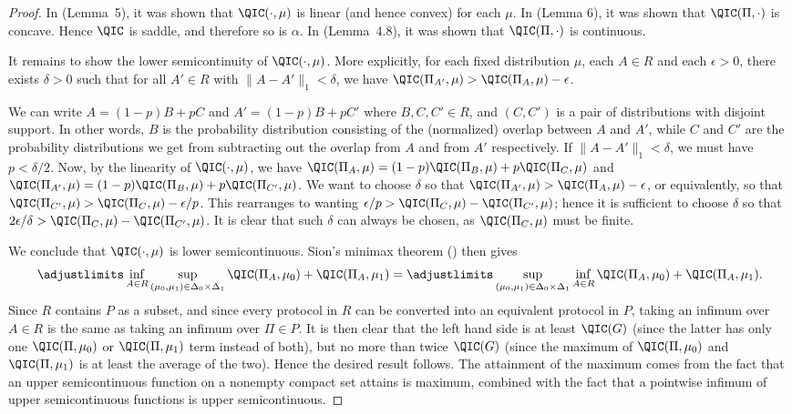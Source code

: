 \begin{proof}
In \cite{Tou15} (Lemma~5), it was shown that $\QIC(\cdot,\mu)$
is linear (and hence convex) for each $\mu$. In \cite{Tou15}
(Lemma 6), it was shown that $\QIC(\Pi,\cdot)$ is concave.
Hence $\QIC$ is saddle, and therefore so is $\alpha$.
In \cite{BGK+18} (Lemma~4.8), it was shown that $\QIC(\Pi,\cdot)$
is continuous.

It remains to show the lower semicontinuity of $\QIC(\cdot,\mu)$.
More explicitly, for each fixed distribution $\mu$, each $A\in R$
and each $\epsilon>0$, there exists $\delta>0$ such that
for all $A'\in R$ with $\|A-A'\|_1<\delta$, we have
$\QIC(\Pi_{A'},\mu)>\QIC(\Pi_A,\mu)-\epsilon$.

We can write $A=(1-p)B+pC$
and $A'=(1-p)B+pC'$ where $B,C,C'\in R$, and $(C,C')$
is a pair of distributions with disjoint support. In other words,
$B$ is the probability distribution consisting of the (normalized)
overlap between $A$ and $A'$, while $C$ and $C'$ are the probability
distributions we get from subtracting out the overlap from $A$
and from $A'$ respectively. If $\|A-A'\|_1<\delta$, we must have
$p<\delta/2$. Now, by the linearity of $\QIC(\cdot,\mu)$,
we have
$\QIC(\Pi_A,\mu)=(1-p)\QIC(\Pi_B,\mu)+p\QIC(\Pi_C,\mu)$ and
$\QIC(\Pi_{A'},\mu)=(1-p)\QIC(\Pi_B,\mu)+p\QIC(\Pi_{C'},\mu)$.
We want to choose $\delta$ so that
$\QIC(\Pi_{A'},\mu)>\QIC(\Pi_A,\mu)-\epsilon$,
or equivalently, so that
$\QIC(\Pi_{C'},\mu) > \QIC(\Pi_C,\mu) - \epsilon/p$.
This rearranges to wanting
$\epsilon/p > \QIC(\Pi_C,\mu)-\QIC(\Pi_{C'},\mu)$;
hence it is sufficient to choose $\delta$ so that
$2\epsilon/\delta > \QIC(\Pi_C,\mu)-\QIC(\Pi_{C'},\mu)$.
It is clear that such $\delta$ can always be chosen,
as $\QIC(\Pi_C,\mu)$ must be finite.

We conclude that $\QIC(\cdot,\mu)$ is lower semicontinuous.
Sion's minimax theorem () then gives
\[\adjustlimits\inf_{A\in R}\sup_{(\mu_0,\mu_1)\in\Delta_0\times\Delta_1}
\QIC(\Pi_A,\mu_0)+\QIC(\Pi_A,\mu_1)
=
\adjustlimits\sup_{(\mu_0,\mu_1)\in\Delta_0\times\Delta_1}\inf_{A\in R}
\QIC(\Pi_A,\mu_0)+\QIC(\Pi_A,\mu_1).\]
Since $R$ contains $P$ as a subset, and since every protocol
in $R$ can be converted into an equivalent protocol in $P$, taking
an infimum over $A\in R$ is the same as taking an infimum over $\Pi\in P$.
It is then clear that the left hand side is at least $\QIC(G)$
(since the latter has only one $\QIC(\Pi,\mu_0)$ or $\QIC(\Pi,\mu_1)$
term instead of both), but no more than twice $\QIC(G)$
(since the maximum of $\QIC(\Pi,\mu_0)$ and $\QIC(\Pi,\mu_1)$
is at least the average of the two).
Hence the desired result follows. The attainment of the maximum
comes from the fact that an upper semicontinuous function
on a nonempty compact set attains is maximum, combined
with the fact that a pointwise infimum of upper semicontinuous
functions is upper semicontinuous.
\end{proof}


